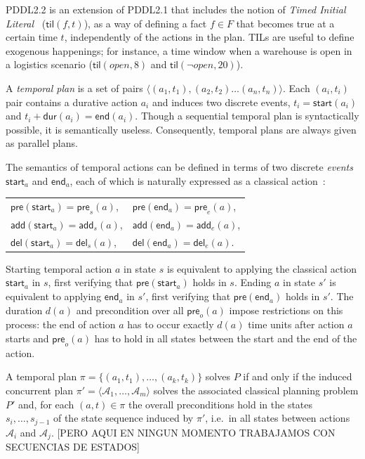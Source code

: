\documentclass[runningheads]{llncs}
\newcommand{\tup}[1]{{\langle #1 \rangle}}
\newcommand{\pre}{\mathsf{pre}}    %
\newcommand{\dur}{\mathsf{dur}}    %
\newcommand{\start}{\mathsf{start}}%
\newcommand{\en}{\mathsf{end}}     %
\newcommand{\til}{\mathsf{til}}    %
\newcommand{\add}{\mathsf{add}}
\newcommand{\del}{\mathsf{del}}
\begin{document}
PDDL2.2 is an extension of PDDL2.1 that includes the notion of {\em Timed Initial Literal}~\cite{hoffmann2005} ($\til(f,t)$), as a way of defining a fact $f\in F$ that becomes true at a certain time $t$, independently of the actions in the plan. TILs are useful to define exogenous happenings; for instance, a time window when a warehouse is open in a logistics scenario ($\til(open,8)$ and $\til(\neg open,20)$).

A {\em temporal plan} is a set of pairs $\tup{(a_1,t_1),(a_2,t_2)\ldots (a_n,t_n)}$. Each $(a_i,t_i)$ pair contains a durative action $a_i$ and induces two discrete events, $t_i=\start(a_i)$ and $t_i+\dur(a_i)=\en(a_i)$. Though a sequential temporal plan is syntactically possible, it is semantically useless. Consequently, temporal plans are always given as parallel plans.

The semantics of temporal actions can be defined in terms of two discrete \textit{events} $\mathsf{start}_a$ and $\mathsf{end}_a$, each of which is naturally expressed as a classical action~\cite{jimenez2015temporal}:

\vspace*{5pt}
\begin{tabular}{ll}
$\pre(\mathsf{start}_a) = \pre_s(a)$, & $\pre(\mathsf{end}_a) = \pre_e(a)$,\\[2pt]
$\add(\mathsf{start}_a) = \add_s(a)$, & $\add(\mathsf{end}_a) = \add_e(a)$,\\[2pt]
$\del(\mathsf{start}_a) = \del_s(a)$, & $\del(\mathsf{end}_a) = \del_e(a)$.
\end{tabular}
\vspace*{5pt}

Starting temporal action $a$ in state $s$ is equivalent to applying the classical action $\mathsf{start}_a$ in $s$, first verifying that $\mathsf{pre}(\mathsf{start}_a)$ holds in $s$. Ending $a$ in state $s'$ is equivalent to applying $\mathsf{end}_a$ in $s'$, first verifying that $\pre(\mathsf{end}_a)$ holds in $s'$. The duration $d(a)$ and precondition over all $\pre_o(a)$ impose restrictions on this process: the end of action $a$ has to occur exactly $d(a)$ time units after action $a$ starts and $\pre_o(a)$ has to hold in all states between the start and the end of the action.

A temporal plan $\pi=\{(a_1,t_1),\ldots,(a_k,t_k)\}$ solves $P$ if and only if the induced concurrent plan $\pi'=\langle\mathcal{A}_1,\ldots,\mathcal{A}_m\rangle$ solves the associated classical planning problem $P'$ and, for each $(a,t)\in\pi$ the overall preconditions hold in the states $s_i,\ldots,s_{j-1}$ of the state sequence induced by $\pi'$, i.e.~in all states between actions $\mathcal{A}_i$ and $\mathcal{A}_j$. [PERO AQUI EN NINGUN MOMENTO TRABAJAMOS CON SECUENCIAS DE ESTADOS]
\end{document}
